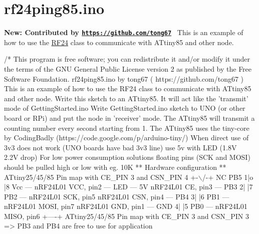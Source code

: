 \hypertarget{rf24ping85_8ino-example}{}\section{rf24ping85.\+ino}
{\bfseries New\+: Contributed by \href{https://github.com/tong67}{\tt https\+://github.\+com/tong67}}~\newline
 This is an example of how to use the \hyperlink{classRF24}{R\+F24} class to communicate with A\+Ttiny85 and other node. ~\newline



\begin{DoxyCodeInclude}
\textcolor{comment}{/*}
\textcolor{comment}{This program is free software; you can redistribute it and/or}
\textcolor{comment}{modify it under the terms of the GNU General Public License}
\textcolor{comment}{version 2 as published by the Free Software Foundation.}
\textcolor{comment}{}
\textcolor{comment}{    rf24ping85.ino by tong67 ( https://github.com/tong67 )}
\textcolor{comment}{    This is an example of how to use the RF24 class to communicate with ATtiny85 and other node.}
\textcolor{comment}{    Write this sketch to an ATtiny85. It will act like the 'transmit' mode of GettingStarted.ino}
\textcolor{comment}{    Write GettingStarted.ino sketch to UNO (or other board or RPi) and put the node in 'receiver' mode.}
\textcolor{comment}{    The ATtiny85 will transmit a counting number every second starting from 1.}
\textcolor{comment}{    The ATtiny85 uses the tiny-core by CodingBadly (https://code.google.com/p/arduino-tiny/)}
\textcolor{comment}{    When direct use of 3v3 does not work (UNO boards have bad 3v3 line) use 5v with LED (1.8V ~ 2.2V drop)}
\textcolor{comment}{    For low power consumption solutions floating pins (SCK and MOSI) should be pulled high or low with eg.
       10K}
\textcolor{comment}{}
\textcolor{comment}{    ** Hardware configuration **}
\textcolor{comment}{    ATtiny25/45/85 Pin map with CE\_PIN 3 and CSN\_PIN 4}
\textcolor{comment}{                                 +-\(\backslash\)/-+}
\textcolor{comment}{                   NC      PB5  1|o   |8  Vcc --- nRF24L01  VCC, pin2 --- LED --- 5V}
\textcolor{comment}{    nRF24L01  CE, pin3 --- PB3  2|    |7  PB2 --- nRF24L01  SCK, pin5}
\textcolor{comment}{    nRF24L01 CSN, pin4 --- PB4  3|    |6  PB1 --- nRF24L01 MOSI, pin7}
\textcolor{comment}{    nRF24L01 GND, pin1 --- GND  4|    |5  PB0 --- nRF24L01 MISO, pin6}
\textcolor{comment}{                                 +----+}
\textcolor{comment}{}
\textcolor{comment}{    ATtiny25/45/85 Pin map with CE\_PIN 3 and CSN\_PIN 3 => PB3 and PB4 are free to use for application}

\end{DoxyCodeInclude}
